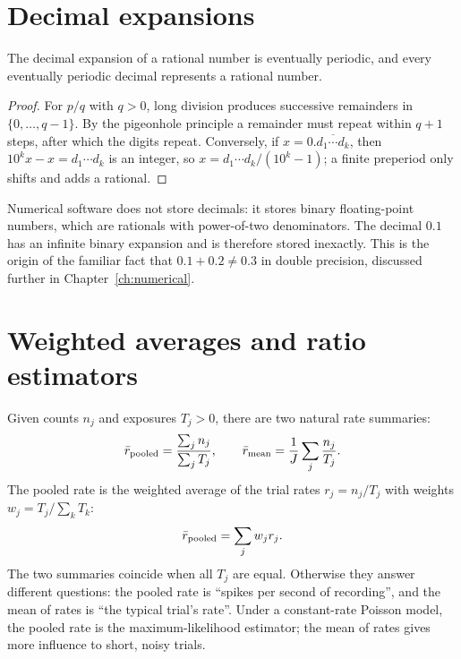 \section{Decimal expansions}
\begin{proposition}
The decimal expansion of a rational number is eventually periodic, and every eventually periodic decimal represents a rational number.
\end{proposition}
\begin{proof}
For $p/q$ with $q>0$, long division produces successive remainders in $\{0,\ldots,q-1\}$. By the pigeonhole principle a remainder must repeat within $q+1$ steps, after which the digits repeat. Conversely, if $x=0.\overline{d_1\cdots d_k}$, then $10^kx-x=d_1\cdots d_k$ is an integer, so $x=d_1\cdots d_k/(10^k-1)$; a finite preperiod only shifts and adds a rational.
\end{proof}
Numerical software does not store decimals: it stores binary floating-point numbers, which are rationals with power-of-two denominators. The decimal $0.1$ has an infinite binary expansion and is therefore stored inexactly. This is the origin of the familiar fact that $0.1+0.2\ne0.3$ in double precision, discussed further in Chapter~\ref{ch:numerical}.

\section{Weighted averages and ratio estimators}
Given counts $n_j$ and exposures $T_j>0$, there are two natural rate summaries:
\[
\bar r_{\rm pooled}=\frac{\sum_jn_j}{\sum_jT_j},\qquad
\bar r_{\rm mean}=\frac1J\sum_j\frac{n_j}{T_j}.
\]
The pooled rate is the weighted average of the trial rates $r_j=n_j/T_j$ with weights $w_j=T_j/\sum_kT_k$:
\[
\bar r_{\rm pooled}=\sum_jw_jr_j.
\]
The two summaries coincide when all $T_j$ are equal. Otherwise they answer different questions: the pooled rate is ``spikes per second of recording'', and the mean of rates is ``the typical trial's rate''. Under a constant-rate Poisson model, the pooled rate is the maximum-likelihood estimator; the mean of rates gives more influence to short, noisy trials.

